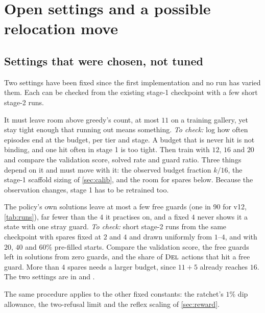 \documentclass[11pt,a4paper]{article}
\begin{document}
\section{Open settings and a possible relocation move}\label{sec:next}

\subsection{Settings that were chosen, not tuned}

Two settings have been fixed since the first implementation and no run has varied them.
Each can be checked from the existing stage-1 checkpoint with a few short stage-2 runs.

\begin{description}[leftmargin=1.6em]
  \item[Guard budget, 16 (\code{max\_guards}).] It must leave room above greedy's count, at
        most $11$ on a training gallery, yet stay tight enough that running out means
        something. \emph{To check:} log how often episodes end at the budget, per tier and
        stage. A budget that is never hit is not binding, and one hit often in stage 1 is too
        tight. Then train with $12$, $16$ and $20$ and compare the validation score, solved
        rate and guard ratio. Three things depend on it and must move with it: the observed
        budget fraction $k/16$, the stage-1 scaffold sizing of \cref{sec:calib}, and the room
        for spares below. Because the observation changes, stage 1 has to be retrained too.
  \item[Pre-filled starts, 4 spares on 40\% of episodes.] The policy's own solutions leave at most a few free guards
        (one in 90 for v12, \cref{tab:runs}), far fewer than the $4$ it practises on, and a fixed $4$ never
        shows it a state with one stray guard. \emph{To check:} short stage-2 runs from the same
        checkpoint with spares fixed at $2$ and $4$ and drawn uniformly from $1$--$4$, and with
        $20$, $40$ and $60\%$ pre-filled starts. Compare the validation score, the free guards
        left in solutions from zero guards, and the share of $\textsc{Del}$ actions that hit a free guard.
        More than $4$ spares needs a larger budget, since $11+5$ already reaches $16$. The
        two settings are  in  and .
\end{description}
The same procedure applies to the other fixed constants: the ratchet's $1\%$ dip allowance,
the two-refusal limit and the reflex scaling of \cref{sec:reward}.
\end{document}
